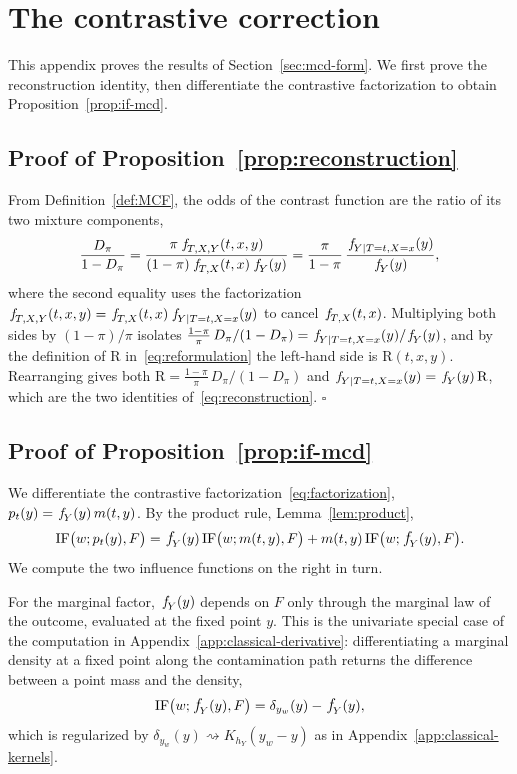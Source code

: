 \documentclass[11pt]{article}
\theoremstyle{plain}
\theoremstyle{definition}
\theoremstyle{remark}
\newcommand{\pf}[1]{\ensuremath{\,\mathlarger{\textit{f}}_{#1}}}
\newcommand{\ratio}{\ensuremath{\pi}}
\newcommand{\contrast}{D_{\ratio}}
\newcommand{\DensityRatio}{\text{R}}
\newcommand{\IF}{\mathrm{IF}}
\begin{document}
\section{The contrastive correction}
\label{app:mcd}

This appendix proves the results of Section~\ref{sec:mcd-form}. We first prove the
reconstruction identity, then differentiate the contrastive factorization to obtain
Proposition~\ref{prop:if-mcd}.

\subsection{Proof of Proposition~\ref{prop:reconstruction}}
\label{app:mcd-reconstruction}

From Definition~\ref{def:MCF}, the odds of the contrast function are the ratio of its two
mixture components,
\[
\frac{\contrast}{1-\contrast}
= \frac{\ratio\,\pf{T,X,Y}(t,x,y)}{(1-\ratio)\,\pf{T,X}(t,x)\,\pf{Y}(y)}
= \frac{\ratio}{1-\ratio}\,\frac{\pf{Y \mid T=t,X=x}(y)}{\pf{Y}(y)} ,
\]
where the second equality uses the factorization
$\pf{T,X,Y}(t,x,y) = \pf{T,X}(t,x)\,\pf{Y \mid T=t,X=x}(y)$ to cancel $\pf{T,X}(t,x)$.
Multiplying both sides by $(1-\ratio)/\ratio$ isolates
$\frac{1-\ratio}{\ratio}\,\contrast/(1-\contrast) = \pf{Y \mid T=t,X=x}(y)/\pf{Y}(y)$, and by
the definition of $\DensityRatio$ in~\eqref{eq:reformulation} the left-hand side is
$\DensityRatio(t,x,y)$. Rearranging gives both
$\DensityRatio = \frac{1-\ratio}{\ratio}\,\contrast/(1-\contrast)$ and
$\pf{Y \mid T=t,X=x}(y) = \pf{Y}(y)\,\DensityRatio$, which are the two identities
of~\eqref{eq:reconstruction}. \hfill$\square$

\subsection{Proof of Proposition~\ref{prop:if-mcd}}
\label{app:mcd-derivation}

We differentiate the contrastive factorization~\eqref{eq:factorization},
$p_t(y) = \pf{Y}(y)\,m(t,y)$. By the product rule, Lemma~\ref{lem:product},
\begin{equation}
\IF\big(w;p_t(y),F\big)
= \pf{Y}(y)\,\IF\big(w;m(t,y),F\big)
+ m(t,y)\,\IF\big(w;\pf{Y}(y),F\big).
\label{eq:app-product}
\end{equation}
We compute the two influence functions on the right in turn.

For the marginal factor, $\pf{Y}(y)$ depends on $F$ only through the marginal law of the
outcome, evaluated at the fixed point $y$. This is the univariate special case of the
computation in Appendix~\ref{app:classical-derivative}: differentiating a marginal density at a
fixed point along the contamination path returns the difference between a point mass and the
density,
\begin{equation}
\IF\big(w;\pf{Y}(y),F\big) = \delta_{y_w}(y) - \pf{Y}(y),
\label{eq:app-if-fY}
\end{equation}
which is regularized by $\delta_{y_w}(y) \rightsquigarrow K_{h_Y}(y_w - y)$ as in
Appendix~\ref{app:classical-kernels}.
\end{document}
